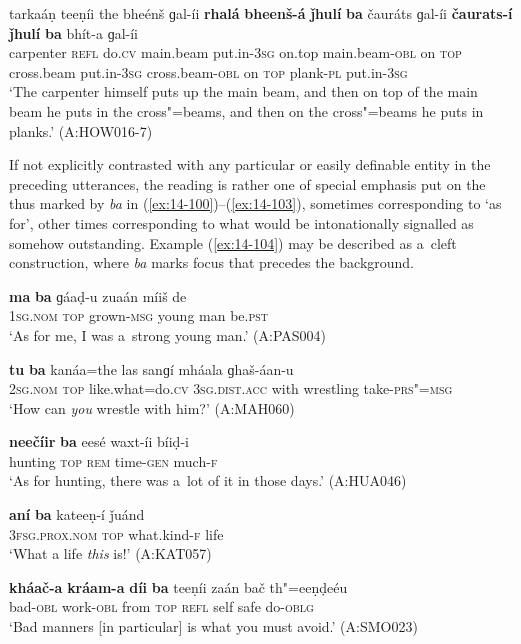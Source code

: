 \begin{exe}
\ex
\label{ex:14-99}
\gll tarkaáṇ teeṇíi the bheénš ɡal-íi  \textbf{rhalá} \textbf{bheenš-á} \textbf{ǰhulí} \textbf{ba} čauráts ɡal-íi \textbf{čaurats-í} \textbf{ǰhulí} \textbf{ba} bhít-a ɡal-íi\\
carpenter \textsc{refl} do.\textsc{cv} main.beam put.in-\textsc{3sg} on.top main.beam-\textsc{obl} on \textsc{top} cross.beam put.in-\textsc{3sg} cross.beam-\textsc{obl} on \textsc{top} plank-\textsc{pl} put.in-\textsc{3sg}\\
\glt `The carpenter himself puts up the main beam, and then on top of the main beam he puts in the cross"=beams, and then on the cross"=beams he puts in planks.' (A:HOW016-7)
\end{exe}

If not explicitly contrasted with any particular or easily definable entity in the preceding utterances, the reading is rather one of special emphasis put on the  thus marked by \textit{ba} in (\ref{ex:14-100})--(\ref{ex:14-103}), sometimes corresponding to \iliEnglish `as for', other times corresponding to what would be intonationally signalled as somehow outstanding. Example (\ref{ex:14-104}) may be described as a~cleft construction, where \textit{ba} marks focus that precedes the background.

\begin{exe}
\ex
\label{ex:14-100}
\gll \textbf{ma} \textbf{ba} ɡáaḍ-u zuaán míiš de \\
\textsc{1sg.nom} \textsc{top} grown-\textsc{msg} young man be.\textsc{pst}  \\
\glt `As for me, I was a~strong young man.' (A:PAS004)

\ex
\label{ex:14-101}
\gll \textbf{tu} \textbf{ba} kanáa=the las sanɡí  mháala ɡhaš-áan-u\\
\textsc{2sg.nom} \textsc{top} like.what=do.\textsc{cv} \textsc{3sg.dist.acc} with wrestling take-\textsc{prs"=msg}\\
\glt `How can \textit{you} wrestle with him?' (A:MAH060)

\ex
\label{ex:14-102}
\gll \textbf{neečíir} \textbf{ba} eesé waxt-íi bíiḍ-i \\
hunting \textsc{top} \textsc{rem} time-\textsc{gen} much-\textsc{f } \\
\glt `As for hunting, there was a~lot of it in those days.' (A:HUA046)

\ex
\label{ex:14-103}
\gll \textbf{aní} \textbf{ba} kateeṇ-í ǰuánd \\
\textsc{3fsg.prox.nom} \textsc{top} what.kind-\textsc{f} life  \\
\glt `What a life \textit{this} is!' (A:KAT057)

\ex
\label{ex:14-104}
\gll \textbf{kháač-a} \textbf{kráam-a} \textbf{díi} \textbf{ba} teeṇíi zaán bač th"=eeṇḍeéu \\
bad-\textsc{obl} work-\textsc{obl } from \textsc{top} \textsc{refl} self safe do-\textsc{oblg} \\
\glt `Bad manners [in particular] is what you must avoid.' (A:SMO023)
\end{exe}

